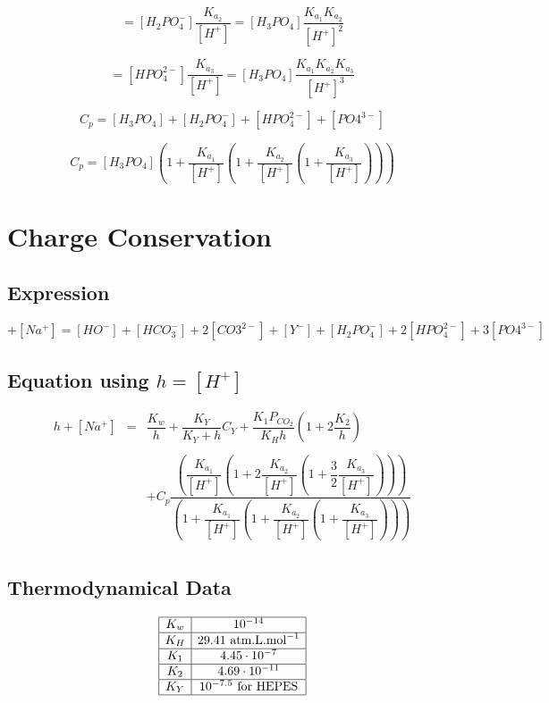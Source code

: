 \documentclass[aps,12pt]{revtex4}
\begin{document}
\begin{equation}
	[HPO_4^{2-}] = [H_2PO_4^-] \dfrac{K_{a_2}}{[H^+]} = [H_3PO_4] \dfrac{K_{a_1}K_{a_2}}{[H^+]^2}
\end{equation}

\begin{equation}
	[PO4^{3-}] = [HPO_4^{2-}] \dfrac{K_{a_3}}{[H^+]} = [H_3PO_4] \dfrac{K_{a_1}K_{a_2}K_{a_3}}{[H^+]^3}
\end{equation}

\begin{equation}
	C_p = [H_3PO_4] + [H_2PO_4^-] + [HPO_4^{2-}] + [PO4^{3-}] 
\end{equation}

\begin{equation}
	C_p = [H_3PO_4] \left( 1 + \dfrac{K_{a_1}}{[H^+]} \left( 1 + \dfrac{K_{a_2}}{[H^+]}\left( 1 + \dfrac{K_{a_3}}{[H^+]} \right)  \right) \right)
\end{equation}

\section{Charge Conservation}

\subsection{Expression}

\begin{equation}
	[H^+] + [Na^+] = [HO^-] + [HCO_3^-] + 2[CO3^{2-}] + [Y^-] + [H_2PO_4^-] + 2[HPO_4^{2-}] + 3[PO4^{3-}] 
\end{equation}

\subsection{Equation using $h=[H^+]$}

\begin{equation}
\begin{array}{rcl}
	h + [Na^+] & = & \dfrac{K_w}{h} + \dfrac{K_Y}{K_Y + h} C_Y + \dfrac{K_1 P_{CO_2}}{K_H h } \left( 1 + 2 \dfrac{K_2}{h} \right)\\
	\\
	& & + C_p
	\dfrac
	{\left( \dfrac{K_{a_1}}{[H^+]} \left(1+2\dfrac{K_{a_2}}{[H^+]}\left(1+\dfrac{3}{2}\dfrac{K_{a_3}}{[H^+]}\right)\right) \right)}
	{\left( 1 + \dfrac{K_{a_1}}{[H^+]} \left( 1 + \dfrac{K_{a_2}}{[H^+]}\left( 1 + \dfrac{K_{a_3}}{[H^+]} \right)  \right) \right)}\\
\end{array}
\end{equation}	

\subsection{Thermodynamical Data}

\begin{equation}
\begin{array}{|c|c|}
\hline
K_w & 10^{-14} \\
\hline
K_H & 29.41\text{ atm.L.mol}^{-1}\\
\hline
K_1 & 4.45 \cdot 10^{-7}\\
\hline
K_2 & 4.69 \cdot 10^{-11}\\
\hline
K_Y & 10^{-7.5} \text{ for HEPES}\\
\hline
\end{array}
\end{equation}
\end{document}
